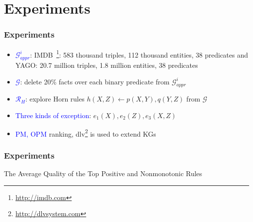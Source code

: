 \documentclass{beamer}
\newcommand{\bl}[1]{\textcolor{blue}{#1}}
\def\cG{\ensuremath{\mathcal{G}}}
\def\cR{\ensuremath{\mathcal{R}}}
\newcommand{\mi}[1]{\ensuremath{\mathit{#1}}}
\begin{document}
\section{Experiments}
\begin{frame}\frametitle{Experiments}
\begin{itemize}
\item \bl{$\cG^i_{\mi{appr}}$}: IMDB~\footnote{\url{http://imdb.com}}: 583 thousand triples, 112 thousand entities, 38 predicates and YAGO: 20.7 million triples, 1.8 million entities, 38 predicates

\medskip

\item \bl{$\cG$}: delete 20\% facts over each binary predicate from $\cG^i_{\mi{appr}}$
\medskip

\item \bl{$\cR_H$}: explore Horn rules $\mi{h(X,Z)\leftarrow p(X,Y),q(Y,Z)}$ from $\cG$
\medskip

\item \bl{Three kinds of exception}: $\mi{e_1(X),e_2(Z),e_3(X,Z)}$
\medskip

\item \bl{PM, OPM} ranking, dlv\footnote{\url{http://dlvsystem.com}} is used to extend KGs
\end{itemize}

\end{frame}

\begin{frame}\frametitle{Experiments}

\begin{table}[ht]
\centering
\footnotesize
\renewcommand*{\arraystretch}{1.07}
\centering

\caption{The Average Quality of the Top Positive and Nonmonotonic Rules}
\label{tab:rules_quality}
\end{table}
\centerline{\cite{rumis}}

\end{frame}
\end{document}
